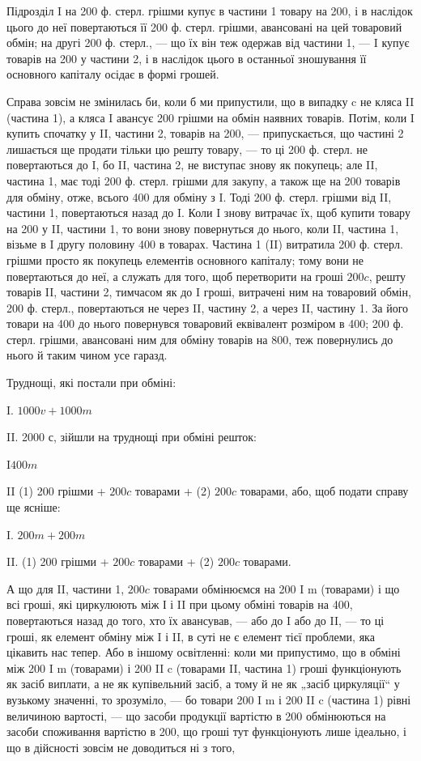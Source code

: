 Підрозділ I на 200 ф. стерл. грішми купує в частини 1 товару на
200, і в наслідок цього до неї повертаються її 200 ф. стерл. грішми,
авансовані на цей товаровий обмін; на другі 200 ф. стерл., — що їх він
теж одержав від частини 1, — I купує товарів на 200 у частини 2, і в
наслідок цього в останньої зношування її основного капіталу осідає в
формі грошей.

Справа зовсім не змінилась би, коли б ми припустили, що в випадку
c не кляса II (частина 1), а кляса I авансує 200 грішми на обмін наявних
товарів. Потім, коли I купить спочатку у II, частини 2, товарів на
200, — припускається, що частині 2 лишається ще продати тільки цю
решту товару, — то ці 200 ф. стерл. не повертаються до I, бо II, частина
2, не виступає знову як покупець; але II, частина 1, має тоді 200 ф. стерл.
грішми для закупу, а також ще на 200 товарів для обміну, отже, всього
400 для обміну з I. Тоді 200 ф. стерл. грішми від    II, частини 1, повертаються
назад до I. Коли I знову витрачає їх, щоб купити    товару на
200 у II, частини 1, то вони знову повернуться до нього, коли II,
частина 1, візьме в I другу половину 400 в товарах. Частина 1 (II)
витратила 200 ф. стерл. грішми просто як покупець елементів основного
капіталу; тому вони не повертаються до неї, а служать для того,
щоб перетворити на гроші $200 c$, решту товарів II, частини 2, тимчасом
як до I гроші, витрачені ним на товаровий обмін, 200 ф. стерл., повертаються
не через II, частину 2, а через II, частину 1. За його товари
на 400 до нього повернувся товаровий еквівалент розміром в 400;
200 ф. стерл. грішми, авансовані ним для обміну товарів на 800, теж
повернулись до нього й таким чином усе гаразд.

Труднощі, які постали при обміні:

I.    $1000 v + 1000 m$

II.    2000 с, зійшли на труднощі при обміні решток:

I\dotfill $400 m$

II (1) 200 грішми + $200 c$ товарами + (2) $200 c$ товарами, або, щоб
подати справу ще ясніше:

I.    $200 m + 200 m$

II. (1) 200 грішми + $200 c$ товарами + (2) $200 c$ товарами.

А що для II, частини 1, $200 c$ товарами обмінюємся на 200 I m
(товарами) і що всі гроші, які циркулюють між І і II при цьому обміні
товарів на 400, повертаються назад до того, хто їх авансував, — або до
I або до II, — то ці гроші, як елемент обміну між I і II, в суті не є
елемент тієї проблеми, яка цікавить нас тепер. Або в іншому освітленні:
коли ми припустимо, що в обміні між 200 I m (товарами) і 200 II c
(товарами II, частина 1) гроші функціонують як засіб виплати, а не як
купівельний засіб, а тому й не як „засіб циркуляції“ у вузькому значенні,
то зрозуміло, — бо товари 200 I m і 200 II c (частина 1)
рівні величиною вартості, — що засоби продукції вартістю в 200 обмінюються
на засоби споживання вартістю в 200, що гроші тут функціонують
лише ідеально, і що в дійсності зовсім не доводиться ні з того,
\parbreak{}  %
